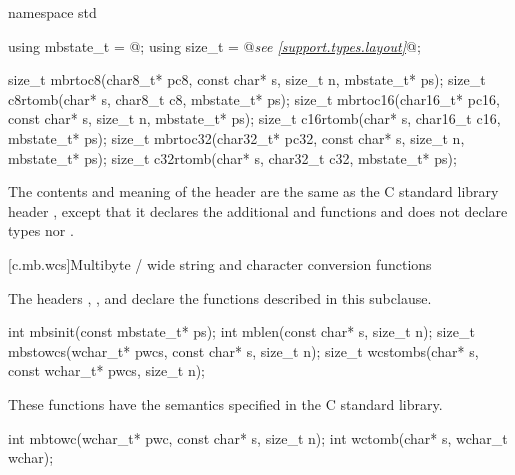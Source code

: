 %
%
%
%
%
%
%
%
\begin{codeblock}
namespace std {
  using mbstate_t = @\seebelow@;
  using size_t = @\textit{see \ref{support.types.layout}}@;

  size_t mbrtoc8(char8_t* pc8, const char* s, size_t n, mbstate_t* ps);
  size_t c8rtomb(char* s, char8_t c8, mbstate_t* ps);
  size_t mbrtoc16(char16_t* pc16, const char* s, size_t n, mbstate_t* ps);
  size_t c16rtomb(char* s, char16_t c16, mbstate_t* ps);
  size_t mbrtoc32(char32_t* pc32, const char* s, size_t n, mbstate_t* ps);
  size_t c32rtomb(char* s, char32_t c32, mbstate_t* ps);
}
\end{codeblock}

\pnum
The contents and meaning of the header 
are the same as the C standard library header
, except that it
declares the additional  and  functions
and does not declare types  nor .


[c.mb.wcs]{Multibyte / wide string and character conversion functions}

\pnum
\begin{note}
The headers ,
,
and 
declare the functions described in this subclause.
\end{note}

%
%
%
%
\begin{itemdecl}
int mbsinit(const mbstate_t* ps);
int mblen(const char* s, size_t n);
size_t mbstowcs(wchar_t* pwcs, const char* s, size_t n);
size_t wcstombs(char* s, const wchar_t* pwcs, size_t n);
\end{itemdecl}

\begin{itemdescr}
\pnum
\effects
These functions have the semantics specified in the C standard library.
\end{itemdescr}


%
%
\begin{itemdecl}
int mbtowc(wchar_t* pwc, const char* s, size_t n);
int wctomb(char* s, wchar_t wchar);
\end{itemdecl}

